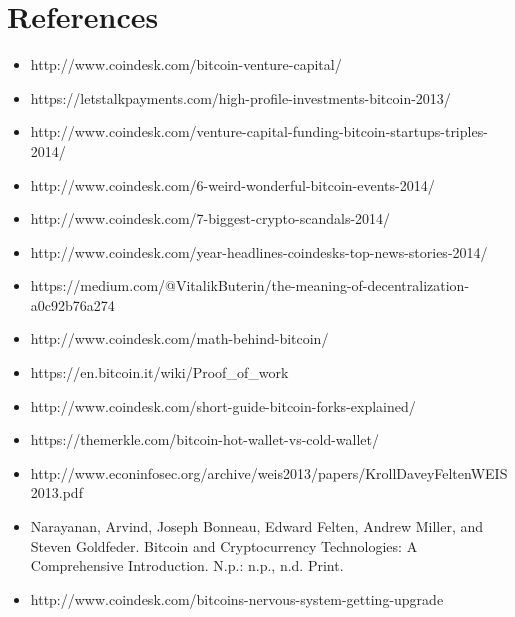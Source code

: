\documentclass[full.tex]{subfiles}
\begin{document}
    
    \setlength{\parindent}{0pt}
    
    \section*{References}
    \begin{itemize}
        \item http://www.coindesk.com/bitcoin-venture-capital/
        \item https://letstalkpayments.com/high-profile-investments-bitcoin-2013/ 
        \item http://www.coindesk.com/venture-capital-funding-bitcoin-startups-triples-2014/ 
        \item http://www.coindesk.com/6-weird-wonderful-bitcoin-events-2014/ 
        \item http://www.coindesk.com/7-biggest-crypto-scandals-2014/ 
        \item http://www.coindesk.com/year-headlines-coindesks-top-news-stories-2014/ 
        \item https://medium.com/@VitalikButerin/the-meaning-of-decentralization-a0c92b76a274 
        \item http://www.coindesk.com/math-behind-bitcoin/
        \item https://en.bitcoin.it/wiki/Proof\_of\_work
        \item http://www.coindesk.com/short-guide-bitcoin-forks-explained/
        \item https://themerkle.com/bitcoin-hot-wallet-vs-cold-wallet/
        \item http://www.econinfosec.org/archive/weis2013/papers/KrollDaveyFeltenWEIS2013.pdf
        \item Narayanan, Arvind, Joseph Bonneau, Edward Felten, Andrew Miller, and Steven Goldfeder. Bitcoin and Cryptocurrency Technologies: A Comprehensive Introduction. N.p.: n.p., n.d. Print.
        \item http://www.coindesk.com/bitcoins-nervous-system-getting-upgrade
    \end{itemize}
    
\end{document}
